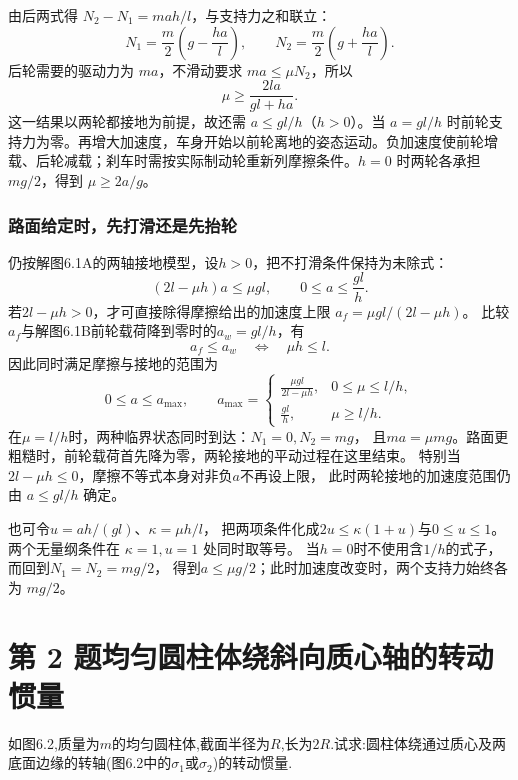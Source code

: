 \documentclass[UTF8,fontset=fandol,a4paper,11pt]{ctexart}
\newcommand{\tagline}[1]{\noindent{\small\color{muted}#1}\par}
\newcommand{\result}[1]{\begin{equation*}\boxed{#1}\end{equation*}}
\begin{document}
由后两式得 $N_2-N_1=mah/l$，与支持力之和联立：
\[
 N_1=\frac m2\left(g-\frac{ha}{l}\right),\qquad
 N_2=\frac m2\left(g+\frac{ha}{l}\right).
\]
后轮需要的驱动力为 $ma$，不滑动要求 $ma\le\mu N_2$，所以
\[\result{\mu\ge\frac{2la}{gl+ha}.}\]
这一结果以两轮都接地为前提，故还需 $a\le gl/h$（$h>0$）。当 $a=gl/h$ 时前轮支持力为零。再增大加速度，车身开始以前轮离地的姿态运动。负加速度使前轮增载、后轮减载；刹车时需按实际制动轮重新列摩擦条件。$h=0$ 时两轮各承担 $mg/2$，得到 $\mu\ge2a/g$。
\subsubsection*{路面给定时，先打滑还是先抬轮}
仍按解图6.1A的两轴接地模型，设$h>0$，把不打滑条件保持为未除式：
\[
(2l-\mu h)a\leq\mu gl,\qquad 0\leq a\leq\frac{gl}{h}.
\]
若$2l-\mu h>0$，才可直接除得摩擦给出的加速度上限
$a_f=\mu gl/(2l-\mu h)$。
比较$a_f$与解图6.1B前轮载荷降到零时的$a_w=gl/h$，有
\[
a_f\leq a_w\quad\Longleftrightarrow\quad\mu h\leq l.
\]
因此同时满足摩擦与接地的范围为
\[
0\leq a\leq a_{\max},\qquad
a_{\max}=\begin{cases}
\displaystyle\frac{\mu gl}{2l-\mu h},&0\leq\mu\leq l/h,\\[5pt]
\displaystyle\frac{gl}{h},&\mu\geq l/h.
\end{cases}
\]
在$\mu=l/h$时，两种临界状态同时到达：$N_1=0,N_2=mg$，
且$ma=\mu mg$。路面更粗糙时，前轮载荷首先降为零，两轮接地的平动过程在这里结束。
特别当$2l-\mu h\leq0$，摩擦不等式本身对非负$a$不再设上限，
此时两轮接地的加速度范围仍由 $a\leq gl/h$ 确定。

也可令$u=ah/(gl)$、$\kappa=\mu h/l$，
把两项条件化成$2u\leq\kappa(1+u)$与$0\leq u\leq1$。
两个无量纲条件在 $\kappa=1,u=1$ 处同时取等号。
当$h=0$时不使用含$1/h$的式子，而回到$N_1=N_2=mg/2$，
得到$a\leq\mu g/2$；此时加速度改变时，两个支持力始终各为 $mg/2$。




\section*{第 2 题\quad 均匀圆柱体绕斜向质心轴的转动惯量}

\tagline{M-06-02}

如图6.2,质量为\(m\)的均匀圆柱体,截面半径为\(R\),长为\(2R\).试求:圆柱体绕通过质心及两底面边缘的转轴(图6.2中的\(\sigma_{1}\)或\(\sigma_{2}\))的转动惯量.
\end{document}
